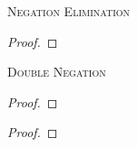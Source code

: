 \begin{multicols}{2}
\noindent\textsc{Negation Elimination}\label{ProofRules-end}

\begin{proof}
	\open
		 \as{}
	\close
	 
\end{proof}
\bigskip


\noindent\textsc{Double Negation}

\begin{proof}
	 
\end{proof}

\begin{proof}
	 
\end{proof}
\bigskip


\vfill\null

\begin{comment}
\section{Derived rules for TFL}

\textsc{Dilemma}

\begin{proof}
	\have[m]{ab}{\meta{A}\eor\meta{B}}
	\have[n]{ac}{\meta{A}\eif\meta{C}}
	\have[p]{bc}{\meta{B}\eif\meta{C}}
	\have[\ ]{a}{\meta{C}} \by{DIL}{ab,ac,bc}
\end{proof}
\bigskip

\textsc{Modus Tollens}

\begin{proof}
	\have[m]{ab}{\meta{A}\eif\meta{B}}
	\have[n]{a}{\enot\meta{B}}
	\have[\ ]{b}{\enot\meta{A}} \by{MT}{ab,a}
\end{proof}
\bigskip

\textsc{Hypothetical Syllogism}

\begin{proof}
	\have[m]{ab}{\meta{A}\eif\meta{B}}
	\have[n]{bc}{\meta{B}\eif\meta{C}}
	\have[\ ]{ac}{\meta{A}\eif\meta{C}}\by{HS}{ab,bc}
\end{proof}

\end{comment}

\end{multicols}

